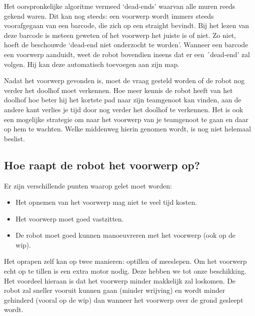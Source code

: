 \documentclass{peno}
\begin{document}
Het oorspronkelijke algoritme vermeed `dead-ends' waarvan alle muren reeds gekend waren. Dit kan nog steeds: een voorwerp wordt immers steeds voorafgegaan van een barcode, die zich op een straight bevindt. Bij het lezen van deze barcode is meteen geweten of het voorwerp het juiste is of niet. Zo niet, hoeft de beschouwde `dead-end niet onderzocht te worden'. Wanneer een barcode een voorwerp aanduidt, weet de robot bovendien ineens dat er een ´dead-end' zal volgen. Hij kan deze automatisch toevoegen aan zijn map.

Nadat het voorwerp gevonden is, moet de vraag gesteld worden of de robot nog verder het doolhof moet verkennen. Hoe meer kennis de robot heeft van het doolhof hoe beter hij het kortste pad naar zijn teamgenoot kan vinden, aan de andere kant verlies je tijd door nog verder het doolhof te verkennen. Het is ook een mogelijke strategie om naar het voorwerp van je teamgenoot te gaan en daar op hem te wachten. Welke middenweg hierin genomen wordt, is nog niet helemaal beslist.



\subsection*{Hoe raapt de robot het voorwerp op?}
Er zijn verschillende punten waarop gelet moet worden:
\begin{itemize}
\item Het opnemen van het voorwerp mag niet te veel tijd kosten.
\item Het voorwerp moet goed vastzitten.
\item De robot moet goed kunnen manoeuvreren met het voorwerp (ook op de wip).
\end{itemize} 

Het oprapen zelf kan op twee manieren: optillen of meeslepen. Om het voorwerp echt op te tillen is een extra motor nodig. Deze hebben we tot onze beschikking. Het voordeel hieraan is dat het voorwerp minder makkelijk zal loskomen. De robot zal sneller vooruit kunnen gaan (minder wrijving) en wordt minder gehinderd (vooral op de wip) dan wanneer het voorwerp over de grond gesleept wordt.
\end{document}
